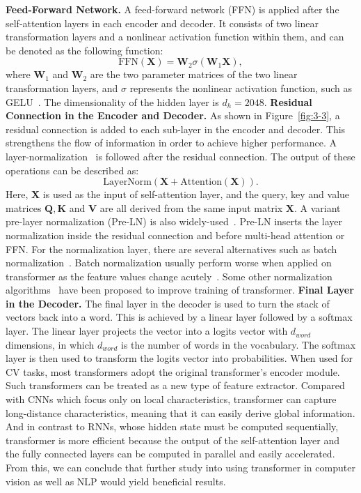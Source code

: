 \noindent\textbf{Feed-Forward Network.} A feed-forward network (FFN) is applied after the self-attention layers in each encoder and decoder. It consists of two linear transformation layers and a nonlinear activation function within them, and can be denoted as the following function:
\begin{equation}
\mathrm{FFN}(\mathbf X)=\mathbf W_2\sigma(\mathbf W_1\mathbf X),
\end{equation}
where $\mathbf W_1$ and $\mathbf W_2$ are the two parameter matrices of the two linear transformation layers, and $\sigma$ represents the nonlinear activation function, such as GELU~. The dimensionality of the hidden layer is $d_h=2048$.
\noindent\textbf{Residual Connection in the Encoder and Decoder.} As shown in Figure~\ref{fig:3-3}, a residual connection is added to each sub-layer in the encoder and decoder. This strengthens the flow of information in order to achieve higher performance. A layer-normalization~ is followed after the residual connection. The output of these operations can be described as:
\begin{equation}
\mathrm{LayerNorm}(\mathbf X+\mathrm{Attention}(\mathbf X)).
\end{equation}
Here, $\mathbf X$ is used as the input of self-attention layer, and the query, key and value matrices $\mathbf Q, \mathbf K$ and $\mathbf V$ are all derived from the same input matrix $\mathbf X$. A variant pre-layer normalization (Pre-LN) is also widely-used~. Pre-LN inserts the layer normalization inside the residual connection and before multi-head attention or FFN.
For the normalization layer, there are several alternatives such as batch normalization~. Batch normalization usually perform worse when applied on transformer as the feature values change acutely~. Some other normalization algorithms~ have been proposed to improve training of transformer.
\noindent\textbf{Final Layer in the Decoder.} The final layer in the decoder is used to turn the stack of vectors back into a word. This is achieved by a linear layer followed by a softmax layer. The linear layer projects the vector into a logits vector with $d_{word}$ dimensions, in which $d_{word}$ is the number of words in the vocabulary. The softmax layer is then used to transform the logits vector into probabilities.
When used for CV tasks, most transformers adopt the original transformer's encoder module. Such transformers can be treated as a new type of feature extractor. Compared with CNNs which focus only on local characteristics, transformer can capture long-distance characteristics, meaning that it can easily derive global information. And in contrast to RNNs, whose hidden state must be computed sequentially, transformer is more efficient because the output of the self-attention layer and the fully connected layers can be computed in parallel and easily accelerated. From this, we can conclude that further study into using transformer in computer vision as well as NLP would yield beneficial results.

